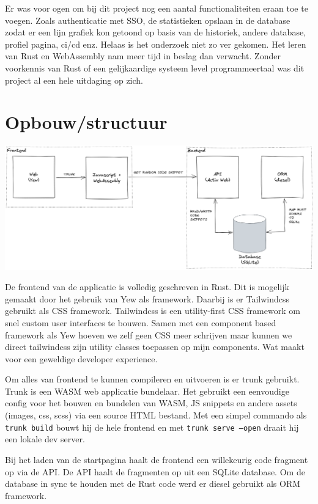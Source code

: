 Er was voor ogen om bij dit project nog een aantal functionaliteiten eraan toe te voegen. Zoals
authenticatie met SSO, de statistieken opslaan in de database zodat er een lijn grafiek kon getoond
op basis van de historiek, andere database, profiel pagina, ci/cd enz. Helaas is het onderzoek niet
zo ver gekomen. Het leren van Rust en WebAssembly nam meer tijd in beslag dan verwacht. Zonder
voorkennis van Rust of een gelijkaardige systeem level programmeertaal was dit project al een hele
uitdaging op zich.

\clearpage

\section{Opbouw/structuur}

\includegraphics[width=\textwidth]{./figures/structuur.png}

De frontend van de applicatie is volledig geschreven in Rust. Dit is mogelijk gemaakt door het
gebruik van Yew als framework. Daarbij is er Tailwindcss gebruikt als CSS framework. Tailwindcss is
een utility-first CSS framework om snel custom user interfaces te bouwen. Samen met een component
based framework als Yew hoeven we zelf geen CSS meer schrijven maar kunnen we direct tailwindcss
zijn utility classes toepassen op mijn components. Wat maakt voor een geweldige developer
experience. 

Om alles van frontend te kunnen compileren en uitvoeren is er trunk gebruikt. Trunk is een WASM web
applicatie bundelaar. Het gebruikt een eenvoudige config voor het bouwen en bundelen van WASM, JS
snippets en andere assets (images, css, scss) via een source HTML bestand. Met een simpel commando
als \texttt{trunk build} bouwt hij de hele frontend en met \texttt{trunk serve
--open} draait hij een lokale dev server.  

Bij het laden van de startpagina haalt de frontend een willekeurig code fragment op via de API. De
API haalt de fragmenten op uit een SQLite database. Om de database in sync te houden met de Rust
code werd er diesel gebruikt als ORM framework.


